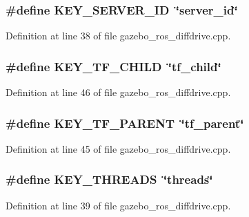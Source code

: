 \subsubsection[{KEY\_\-SERVER\_\-ID}]{\setlength{\rightskip}{0pt plus 5cm}\#define KEY\_\-SERVER\_\-ID~\char`\"{}server\_\-id\char`\"{}}\label{gazebo__ros__diffdrive_8cpp_aba838f74774271adc62f5223c844f0fe}


Definition at line 38 of file gazebo\_\-ros\_\-diffdrive.cpp.

\subsubsection[{KEY\_\-TF\_\-CHILD}]{\setlength{\rightskip}{0pt plus 5cm}\#define KEY\_\-TF\_\-CHILD~\char`\"{}tf\_\-child\char`\"{}}\label{gazebo__ros__diffdrive_8cpp_a70e360a50e857ffc6f32982ee73488f1}


Definition at line 46 of file gazebo\_\-ros\_\-diffdrive.cpp.

\subsubsection[{KEY\_\-TF\_\-PARENT}]{\setlength{\rightskip}{0pt plus 5cm}\#define KEY\_\-TF\_\-PARENT~\char`\"{}tf\_\-parent\char`\"{}}\label{gazebo__ros__diffdrive_8cpp_a526b0d72a46fac5e090caf049c1bb2ac}


Definition at line 45 of file gazebo\_\-ros\_\-diffdrive.cpp.

\subsubsection[{KEY\_\-THREADS}]{\setlength{\rightskip}{0pt plus 5cm}\#define KEY\_\-THREADS~\char`\"{}threads\char`\"{}}\label{gazebo__ros__diffdrive_8cpp_a1c0b253edf7ef5e6eaf91e33c729947e}


Definition at line 39 of file gazebo\_\-ros\_\-diffdrive.cpp.

